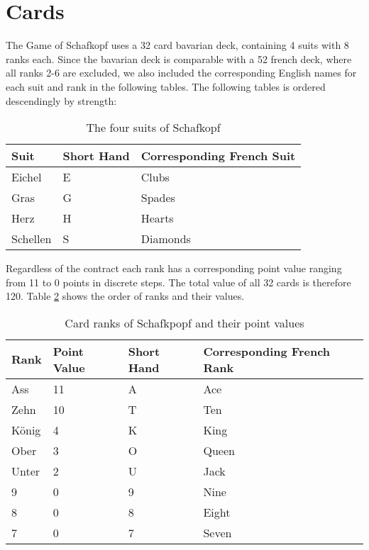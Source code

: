 \section{Cards}\label{sec:cards}
The Game of Schafkopf uses a 32 card bavarian deck, containing 4 suits with 8 ranks each.
Since the bavarian deck is comparable with a 52 french deck, where all ranks 2-6 are excluded, we also included the
corresponding English names for each suit and rank in the following tables.
The following tables is ordered descendingly by strength:
\newline
\begin{table}[h!]
    \centering
    \begin{tabular}{lll}
        \toprule
        Suit     & Short Hand & Corresponding French Suit \\
        \midrule
        Eichel   & E          & Clubs                     \\
        Gras     & G          & Spades                    \\
        Herz     & H          & Hearts                    \\
        Schellen & S          & Diamonds                  \\
        \bottomrule
    \end{tabular}
    \caption{The four suits of Schafkopf}
    \label{tab:suits}
\end{table}
\newline
Regardless of the contract each rank has a corresponding point value ranging from 11 to 0 points in discrete steps.
The total value of all 32 cards is therefore 120.
\newline
Table \ref{tab:cardsvalues} shows the order of ranks and their values.
\newline
\begin{table}[h!]
    \centering
    \begin{tabular}{llll}
        \toprule
        Rank  & Point Value & Short Hand & Corresponding French Rank \\
        \midrule
        Ass   & 11          & A          & Ace                       \\
        Zehn  & 10          & T          & Ten                       \\
        König & 4           & K          & King                      \\
        Ober  & 3           & O          & Queen                     \\
        Unter & 2           & U          & Jack                      \\
        9     & 0           & 9          & Nine                      \\
        8     & 0           & 8          & Eight                     \\
        7     & 0           & 7          & Seven                     \\
        \bottomrule
    \end{tabular}
    \caption{Card ranks of Schafkpopf and their point values}
    \label{tab:cardsvalues}
\end{table}
